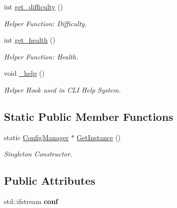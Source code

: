 \begin{DoxyCompactItemize}
int \mbox{\hyperlink{classConfigManager_a93ea2b6222eb97fd706db88f36e3d237}{get\+\_\+difficulty}} ()
\begin{DoxyCompactList}\small\item\em Helper Function\+: Difficulty. \end{DoxyCompactList}\item 
int \mbox{\hyperlink{classConfigManager_af04d8201e892ce16381403a365f77cae}{get\+\_\+health}} ()
\begin{DoxyCompactList}\small\item\em Helper Function\+: Health. \end{DoxyCompactList}\item 
\mbox{\label{classConfigManager_a7835eee23acb1765a5fb10d2c2b2df0b}} 
void \mbox{\hyperlink{classConfigManager_a7835eee23acb1765a5fb10d2c2b2df0b}{\+\_\+help}} ()
\begin{DoxyCompactList}\small\item\em Helper Hook used in C\+LI Help System. \end{DoxyCompactList}\end{DoxyCompactItemize}
\subsection*{Static Public Member Functions}
\begin{DoxyCompactItemize}
\item 
\mbox{\label{classConfigManager_a7184fa362acea064d406c6efa026a0f4}} 
static \mbox{\hyperlink{classConfigManager}{Config\+Manager}} $\ast$ \mbox{\hyperlink{classConfigManager_a7184fa362acea064d406c6efa026a0f4}{Get\+Instance}} ()
\begin{DoxyCompactList}\small\item\em Singleton Constructor. \end{DoxyCompactList}\end{DoxyCompactItemize}
\subsection*{Public Attributes}
\begin{DoxyCompactItemize}
\item 
\mbox{\label{classConfigManager_acfa14aa3d6732ff9405013d2edacaaf6}} 
std\+::ifstream {\bfseries conf}
\end{DoxyCompactItemize}
